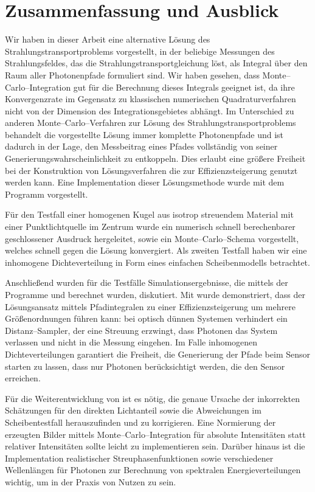 \chapter{Zusammenfassung und Ausblick}
	Wir haben in dieser Arbeit eine alternative Lösung des Strahlungstransportproblems vorgestellt, in der beliebige Messungen des Strahlungsfeldes, das die Strahlungstransportgleichung löst, als Integral über den Raum aller Photonenpfade formuliert sind. Wir haben gesehen, dass Monte--Carlo--Integration gut für die Berechnung dieses Integrals geeignet ist, da ihre Konvergenzrate im Gegensatz zu klassischen numerischen Quadraturverfahren nicht von der Dimension des Integrationsgebietes abhängt. Im Unterschied zu anderen Monte--Carlo--Verfahren zur Lösung des Strahlungstransportproblems behandelt die vorgestellte Lösung immer komplette Photonenpfade und ist dadurch in der Lage, den Messbeitrag eines Pfades vollständig von seiner Generierungswahrscheinlichkeit zu entkoppeln. Dies erlaubt eine größere Freiheit bei der Konstruktion von Lösungsverfahren die zur Effizienzsteigerung genutzt werden kann.
	Eine Implementation dieser Lösungsmethode wurde mit dem Programm \pirate vorgestellt.
	
	Für den Testfall einer homogenen Kugel aus isotrop streuendem Material mit einer Punktlichtquelle im Zentrum wurde ein numerisch schnell berechenbarer geschlossener Ausdruck hergeleitet, sowie ein Monte--Carlo--Schema vorgestellt, welches schnell gegen die Lösung konvergiert. Als zweiten Testfall haben wir eine inhomogene Dichteverteilung in Form eines einfachen Scheibenmodells betrachtet.

	Anschließend wurden für die Testfälle Simulationsergebnisse, die mittels der Programme \mctd und \pirate berechnet wurden, diskutiert.
	Mit \pirate wurde demonstriert, dass der Lösungsansatz mittels Pfadintegralen zu einer Effizienzsteigerung um mehrere Größenordnungen führen kann: bei optisch dünnen Systemen verhindert ein Distanz--Sampler, der eine Streuung erzwingt, dass Photonen das System verlassen und nicht in die Messung eingehen. Im Falle inhomogenen Dichteverteilungen garantiert die Freiheit, die Generierung der Pfade beim Sensor starten zu lassen, dass nur Photonen berücksichtigt werden, die den Sensor erreichen.
	
	Für die Weiterentwicklung von \pirate ist es nötig, die genaue Ursache der inkorrekten Schätzungen für den direkten Lichtanteil sowie die Abweichungen im Scheibentestfall herauszufinden und zu korrigieren. Eine Normierung der erzeugten Bilder mittels Monte--Carlo--Integration für absolute Intensitäten statt relativer Intensitäten sollte leicht zu implementieren sein. Darüber hinaus ist die Implementation realistischer Streuphasenfunktionen sowie verschiedener Wellenlängen für Photonen zur Berechnung von spektralen Energieverteilungen wichtig, um in der Praxis von Nutzen zu sein. 
	
